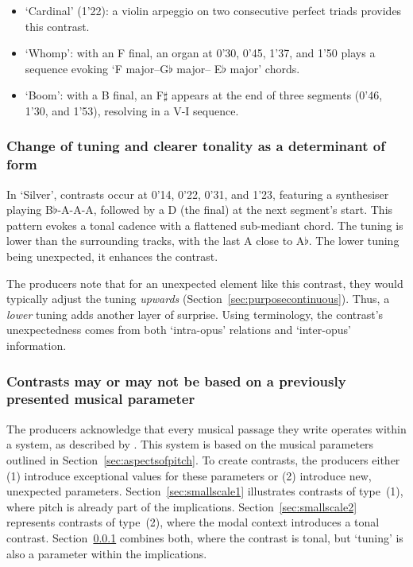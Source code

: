 \documentclass{article}
\begin{document}
\begin{itemize}[noitemsep]
\item `Cardinal' (1'22): a violin arpeggio on two consecutive perfect triads provides this contrast.
\item `Whomp': with an F final, an organ at 0'30, 0'45, 1'37, and 1'50 plays a sequence evoking `F major--G$\flat$ major-- E$\flat$ major' chords.
\item `Boom': with a B final, an F$\sharp$ appears at the end of three segments (0'46, 1'30, and 1'53), resolving in a V-I sequence.
\end{itemize}




\subsubsection{Change of tuning and clearer tonality as a determinant of form}\label{sec:smallscale3}

In `Silver', contrasts occur at 0'14, 0'22, 0'31, and 1'23, featuring a synthesiser playing B$\flat$-A-A-A, followed by a D (the final) at the next segment's start. This pattern evokes a tonal cadence with a flattened sub-mediant chord. The tuning is lower than the surrounding tracks, with the last A close to A$\flat$. The lower tuning being unexpected, it enhances the contrast.

The producers note that for an unexpected element like this contrast, they would typically adjust the tuning \emph{upwards} (Section~\ref{sec:purposecontinuous}). Thus, a \textit{lower} tuning adds another layer of surprise. Using  terminology, the contrast's unexpectedness comes from both `intra-opus' relations and `inter-opus' information.




\subsubsection{Contrasts may or may not be based on a previously presented musical parameter}


The producers acknowledge that every musical passage they write operates within a system, as described by \citet{bimbot2016system}. This system is based on the musical parameters outlined in Section~\ref{sec:aspectsofpitch}. To create contrasts, the producers either (1) introduce exceptional values for these parameters or (2) introduce new, unexpected parameters. Section~\ref{sec:smallscale1} illustrates contrasts of type~(1), where pitch is already part of the implications. Section~\ref{sec:smallscale2} represents contrasts of type~(2), where the modal context introduces a tonal contrast. Section~\ref{sec:smallscale3} combines both, where the contrast is tonal, but `tuning' is also a parameter within the implications.
\end{document}
